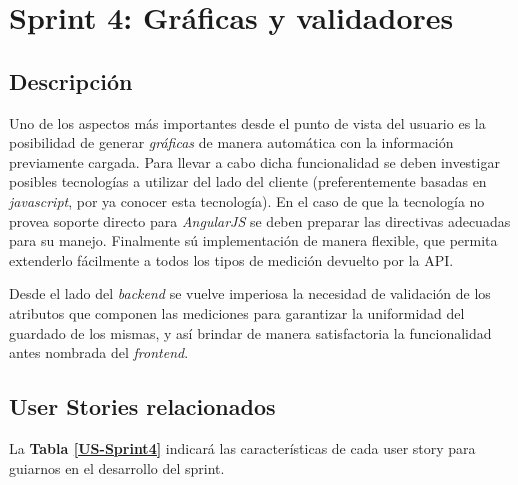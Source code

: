 \section{Sprint 4: Gráficas y validadores}%



\subsection{Descripción}

Uno de los aspectos más importantes desde el punto de vista del usuario es la posibilidad de generar \textit{gráficas} de manera automática con la información previamente cargada. Para llevar a cabo dicha funcionalidad se deben investigar posibles tecnologías a utilizar del lado del cliente (preferentemente basadas en \textit{javascript}, por ya conocer esta tecnología). En el caso de que la tecnología no provea soporte directo para \textit{AngularJS} se deben preparar las directivas adecuadas para su manejo. Finalmente sú implementación de manera flexible, que permita extenderlo fácilmente a todos los tipos de medición devuelto por la API.

Desde el lado del \textit{backend} se vuelve imperiosa la necesidad de validación de los atributos que componen las mediciones para garantizar la uniformidad del guardado de los mismas, y así brindar de manera satisfactoria la funcionalidad antes nombrada del \textit{frontend}.



\subsection{User Stories relacionados}
La \textbf{Tabla \ref{US-Sprint4}} indicará las características de cada user story para guiarnos en el desarrollo del sprint.

